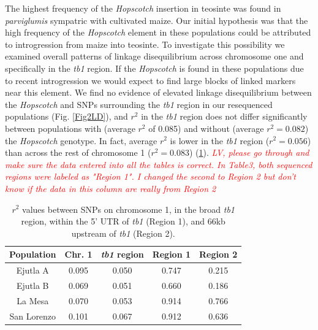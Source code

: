 \documentclass[11pt]{article}
\newcommand{\mbh}[1]{\textcolor{red}{ \emph{\scriptsize  #1}} }
\begin{document}
\begin{linenumbers}
\begin{flushleft}
The highest frequency of the \emph{Hopscotch} insertion in teosinte was found in \emph{parviglumis} sympatric with cultivated maize. Our initial hypothesis was that the high frequency of the \emph{Hopscotch} element in these populations could be attributed to introgression from maize into teosinte. To investigate this possibility we examined overall patterns of linkage disequilibrium across chromosome one and specifically in the \emph{tb1} region. If the \emph{Hopscotch} is found in these populations due to recent introgression we would expect to find large blocks of linked markers near this element. We find no evidence of elevated linkage disequilibrium between the \emph{Hopscotch} and SNPs surrounding the \emph{tb1} region in our resequenced populations (Fig. \ref{Fig2LD}), and $r^{2}$ in the \emph{tb1} region  does not differ significantly between populations with (average $r^{2}$ of 0.085) and without (average $r^{2}=0.082$) the \emph{Hopscotch} genotype. In fact, average $r^{2}$ is lower in the \emph{tb1} region ($r^{2}=0.056$) than across the rest of chromosome 1 ($r^{2}=0.083$) (\ref{Table3R2}). \mbh{LV, please go through and make sure the data entered into all the tables is correct.  In Table3, both sequenced regions were labeled as "Region 1".  I changed the second to Region 2 but don't know if the data in this column are really from Region 2}

\begin{table}[htbp]
  \centering
  \caption{$r^{2}$ values between SNPs on chromosome 1, in the broad \emph{tb1} region, within the 5' UTR of \emph{tb1} (Region 1), and 66kb upstream of \emph{tb1} (Region 2).}
    \begin{tabular}{ccccc}\\\toprule
    \textbf{Population} & \textbf{Chr. 1} & \textbf{\emph{tb1} region} & \textbf{Region 1} & \textbf{Region 2} \\\midrule
    Ejutla A & 0.095 & 0.050 & 0.747 & 0.215 \\
    Ejutla B & 0.069 & 0.051 & 0.660 & 0.186 \\
    La Mesa & 0.070 & 0.053 & 0.914 & 0.766 \\
    San Lorenzo & 0.101 & 0.067 & 0.912 & 0.636 \\
    \bottomrule
    \end{tabular}
  \label{Table3R2}
\end{table}


\end{flushleft}
\end{linenumbers}
\end{document}
